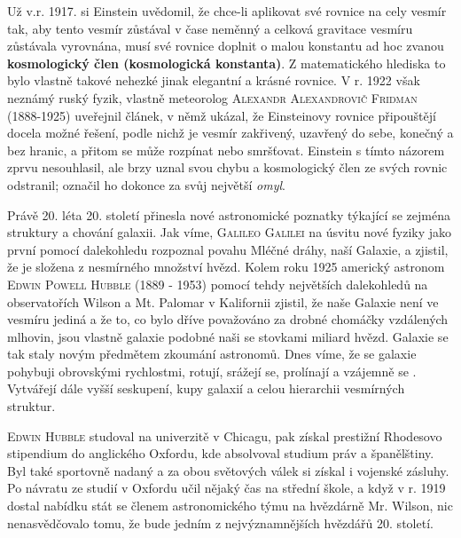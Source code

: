         Už v.r. 1917. si Einstein uvědomil, že chce-li aplikovat své rovnice na cely vesmír tak, aby
        tento vesmír zůstával v čase neměnný a celková gravitace vesmíru zůstávala vyrovnána, musí
        své rovnice doplnit o malou konstantu ad hoc zvanou \textbf{kosmologický člen (kosmologická
        konstanta)}. Z matematického hlediska to bylo vlastně takové nehezké  jinak
        elegantní a krásné rovnice. V r. 1922 však neznámý ruský fyzik, vlastně meteorolog
        \textsc{Alexandr Alexandrovič Fridman} (1888-1925) uveřejnil článek, v němž ukázal, že
        Einsteinovy rovnice připouštějí docela možné řešení, podle nichž je vesmír zakřivený,
        uzavřený do sebe, konečný a bez hranic, a přitom se může rozpínat nebo smršťovat. Einstein s
        tímto názorem zprvu nesouhlasil, ale brzy uznal svou chybu a kosmologický člen ze svých
        rovnic odstranil; označil ho dokonce za svůj největší \emph{omyl}. 
        
        Právě 20. léta 20. století přinesla nové astronomické poznatky týkající se zejména struktury
        a chování galaxii. Jak víme, \textsc{Galileo Galilei} na úsvitu nové fyziky jako první
        pomocí dalekohledu rozpoznal povahu Mléčné dráhy, naší Galaxie, a zjistil, že je složena z
        nesmírného množství hvězd. Kolem roku 1925 americký astronom \textsc{Edwin Powell Hubble}
        (1889 - 1953) pomocí tehdy největších dalekohledů na observatořích Wilson a Mt. Palomar v
        Kalifornii zjistil, že naše Galaxie není ve vesmíru jediná a že to, co bylo dříve považováno
        za drobné chomáčky vzdálených mlhovin, jsou vlastně galaxie podobné naši se stovkami miliard
        hvězd. Galaxie se tak staly novým předmětem zkoumání astronomů. Dnes víme, že se galaxie
        pohybuji obrovskými rychlostmi, rotují, srážejí se, prolínají a vzájemně se .
        Vytvářejí dále vyšší seskupení, kupy galaxií a celou hierarchii vesmírných struktur.
        
        \textsc{Edwin Hubble} studoval na univerzitě v Chicagu, pak získal prestižní Rhodesovo
        stipendium do anglického Oxfordu, kde absolvoval studium práv a španělštiny. Byl také
        sportovně nadaný a za obou světových válek si získal i vojenské zásluhy. Po návratu ze
        studií v Oxfordu učil nějaký čas na střední škole, a když v r. 1919 dostal nabídku stát se
        členem astronomického týmu na hvězdárně Mr. Wilson, nic nenasvědčovalo tomu, že bude jedním
        z nejvýznamnějších hvězdářů 20. století.

